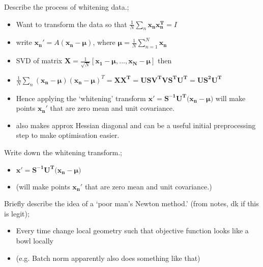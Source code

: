 \documentclass{article}
\begin{document}
Describe the process of whitening data.; \begin{itemize} \item Want to transform the data so that $\frac{1}{N}\sum_n \mathbf{x_nx_n^T} = I$ \item write $\mathbf{x_n}' = A(\mathbf{x_n - \mu})$, where $\mathbf{\mu}=\frac{1}{N}\sum_{n=1}^N\mathbf{x_n}$ \item SVD of matrix $\mathbf{X}=\frac{1}{\sqrt{N}}[\mathbf{x_1 - \mu, ..., x_N - \mu}]$ then  \item $\frac{1}{N}\sum_n(\mathbf{x_n - \mu})(\mathbf{x_n - \mu})^T = \mathbf{XX^T = USV^TVS^TU^T = US^2U^T}$ \item Hence applying the `whitening' transform $\mathbf{x'} = \mathbf{S^{-1}U^T(x_n - \mu})$ will make points $\mathbf{x_n}'$ that are zero mean and unit covariance. \item also makes approx Hessian diagonal and can be a useful initial preprocessing step to make optimisation easier. \end{itemize}

Write down the whitening transform.; \begin{itemize} \item $\mathbf{x'} = \mathbf{S^{-1}U^T(x_n - \mu})$  \item (will make points $\mathbf{x_n}'$ that are zero mean and unit covariance.) \end{itemize} 


Briefly describe the idea of a `poor man's Newton method.' (from notes, dk if this is legit); \begin{itemize} \item Every time change local geometry such that objective function looks like a bowl locally \item (e.g. Batch norm apparently also does something like that) \end{itemize}
\end{document}
